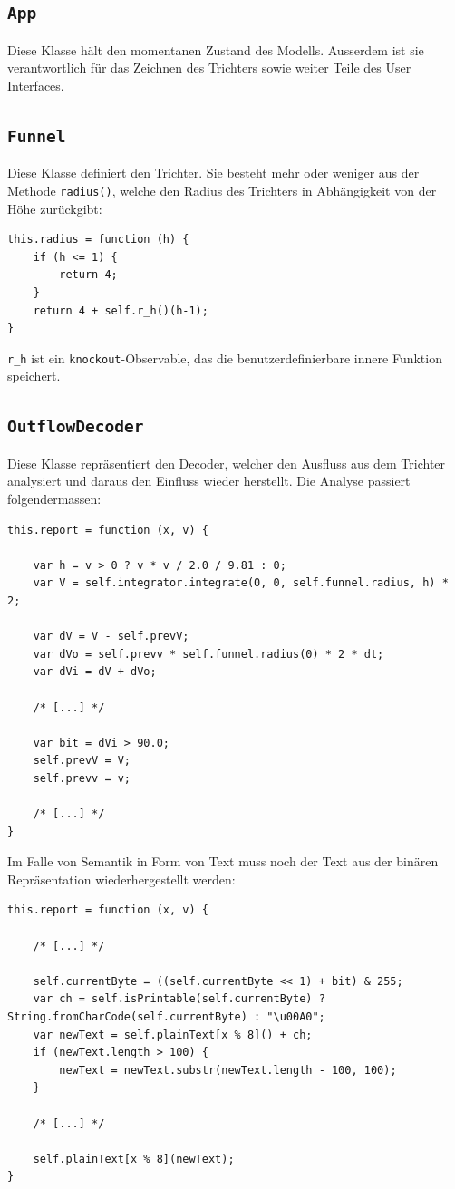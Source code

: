 \documentclass[11pt]{scrreprt} %
\theoremstyle{definition}
\begin{document}
\subsection{{\tt App}}

Diese Klasse hält den momentanen Zustand des Modells. Ausserdem ist sie verantwortlich für das Zeichnen des Trichters sowie weiter Teile des User Interfaces.

\subsection{{\tt Funnel}}

Diese Klasse definiert den Trichter. Sie besteht mehr oder weniger aus der Methode {\tt radius()}, welche den Radius des Trichters in Abhängigkeit von der Höhe zurückgibt:

\begin{lstlisting}
this.radius = function (h) {
	if (h <= 1) {
		return 4;
	}
	return 4 + self.r_h()(h-1);
}
\end{lstlisting}

{\tt r\_h} ist ein {\tt knockout}-Observable, das die benutzerdefinierbare innere Funktion speichert.

\subsection{{\tt OutflowDecoder}}

Diese Klasse repräsentiert den Decoder, welcher den Ausfluss aus dem Trichter analysiert und daraus den Einfluss wieder herstellt. Die Analyse passiert folgendermassen:

\begin{lstlisting}
this.report = function (x, v) {
	
	var h = v > 0 ? v * v / 2.0 / 9.81 : 0;
	var V = self.integrator.integrate(0, 0, self.funnel.radius, h) * 2;

	var dV = V - self.prevV;
	var dVo = self.prevv * self.funnel.radius(0) * 2 * dt;
	var dVi = dV + dVo;
		
	/* [...] */
		
	var bit = dVi > 90.0;
	self.prevV = V;
	self.prevv = v;

	/* [...] */
}
\end{lstlisting}

Im Falle von Semantik in Form von Text muss noch der Text aus der binären Repräsentation wiederhergestellt werden:

\begin{lstlisting}
this.report = function (x, v) {
	
	/* [...] */

	self.currentByte = ((self.currentByte << 1) + bit) & 255;
	var ch = self.isPrintable(self.currentByte) ? String.fromCharCode(self.currentByte) : "\u00A0";
	var newText = self.plainText[x % 8]() + ch;
	if (newText.length > 100) {
		newText = newText.substr(newText.length - 100, 100);
	}

	/* [...] */

	self.plainText[x % 8](newText);
}
\end{lstlisting}
\end{document}
